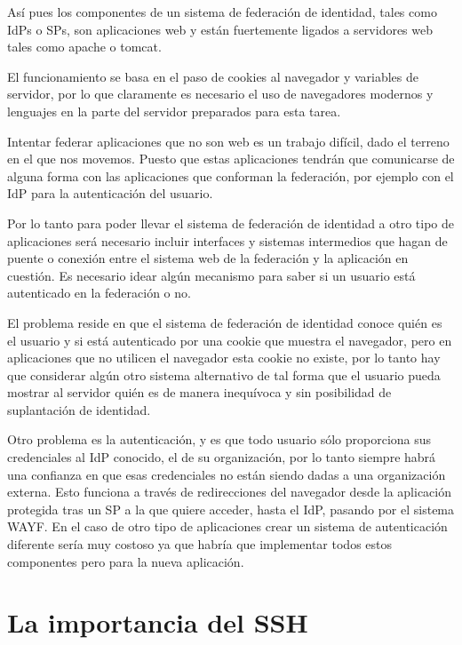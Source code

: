     Así pues los componentes de un sistema de federación de identidad,
    tales como IdPs o SPs, son aplicaciones web y están fuertemente
    ligados a servidores web tales como apache o tomcat.

    El funcionamiento se basa en el paso de cookies al navegador y
    variables de servidor, por lo que claramente es necesario el uso de
    navegadores modernos y lenguajes en la parte del servidor preparados
    para esta tarea.

    Intentar federar aplicaciones que no son web es un trabajo difícil,
    dado el terreno en el que nos movemos. Puesto que estas aplicaciones
    tendrán que comunicarse de alguna forma con las aplicaciones que
    conforman la federación, por ejemplo con el IdP para la autenticación
    del usuario.

    Por lo tanto para poder llevar el sistema de federación de identidad a
    otro tipo de aplicaciones será necesario incluir interfaces y sistemas
    intermedios que hagan de puente o conexión entre el sistema web de la
    federación y la aplicación en cuestión. Es necesario idear algún
    mecanismo para saber si un usuario está autenticado en la federación o
    no.

    El problema reside en que el sistema de federación de identidad conoce
    quién es el usuario y si está autenticado por una cookie que muestra
    el navegador, pero en aplicaciones que no utilicen el navegador esta
    cookie no existe, por lo tanto hay que considerar algún otro sistema
    alternativo de tal forma que el usuario pueda mostrar al servidor
    quién es de manera inequívoca y sin posibilidad de suplantación de
    identidad.


    Otro problema es la autenticación, y es que todo usuario sólo
    proporciona sus credenciales al IdP conocido, el de su
    organización, por lo tanto siempre habrá una confianza en que esas
    credenciales no están siendo dadas a una organización externa. Esto
    funciona a través de redirecciones del navegador desde la aplicación
    protegida tras un SP a la que quiere acceder, hasta el IdP, pasando
    por el sistema WAYF. En el caso de otro tipo de aplicaciones crear un
    sistema de autenticación diferente sería muy costoso ya que habría que
    implementar todos estos componentes pero para la nueva aplicación.

    \section{La importancia del SSH}

